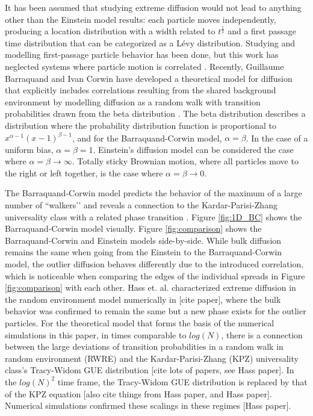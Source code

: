 It has been assumed that studying extreme diffusion would not lead to anything other than the Einstein model results: each particle moves independently, producing a location distribution with a width related to $t^{\frac{1}{2}}$ and a first passage time distribution that can be categorized as a Lévy distribution. Studying and modelling first-passage particle behavior has been done, but this work has neglected systems where particle motion is correlated \cite{grebenkov_exact_2020}. Recently, Guillaume Barraquand and Ivan Corwin have developed a theoretical model for diffusion that explicitly includes correlations resulting from the shared background environment by modelling diffusion as a random walk with transition probabilities drawn from the beta distribution \cite{barraquand_random-walk_2017}. The beta distribution describes a distribution where the probability distribution function is proportional to $x^{\alpha-1}\left(x-1\right)^{\beta-1}$, and for the Barraquand-Corwin model, $\alpha = \beta$. In the case of a uniform bias, $\alpha = \beta = 1$. Einstein's diffusion model can be considered the case where $\alpha = \beta \rightarrow \infty$. Totally sticky Brownian motion, where all particles move to the right or left together, is the case where $\alpha = \beta \rightarrow 0$.

The Barraquand-Corwin model predicts the behavior of the maximum of a large number of ``walkers’’ and reveals a connection to the Kardar-Parisi-Zhang universality class with a related phase transition \cite{barraquand_random-walk_2017, barraquand_moderate_2020, le_doussal_diffusion_2017, kardar_dynamic_1986}. Figure \ref{fig:1D_BC} shows the Barraquand-Corwin model visually. Figure \ref{fig:comparison} shows the Barraquand-Corwin and Einstein models side-by-side. While bulk diffusion remains the same when going from the Einstein to the Barraquand-Corwin model, the outlier diffusion behaves differently due to the introduced correlation, which is noticeable when comparing the edges of the individual spreads in Figure \ref{fig:comparison} with each other. Hass et. al. characterized extreme diffusion in the random environment model numerically in [cite paper], where the bulk behavior was confirmed to remain the same but a new phase exists for the outlier particles. For the theoretical model that forms the basis of the numerical simulations in this paper, in times comparable to $log\left(N\right)$, there is a connection between the large deviations of transition probabilities in a random walk in random environment (RWRE) and the Kardar-Parisi-Zhang (KPZ) universality class's Tracy-Widom GUE distribution [cite lots of papers, see Hass paper]. In  the $log\left(N\right)^{2}$ time frame, the Tracy-Widom GUE distribution is replaced by that of the KPZ equation [also cite things from Hass paper, and Hass paper]. Numerical simulations confirmed these scalings in these regimes [Hass paper].
%

